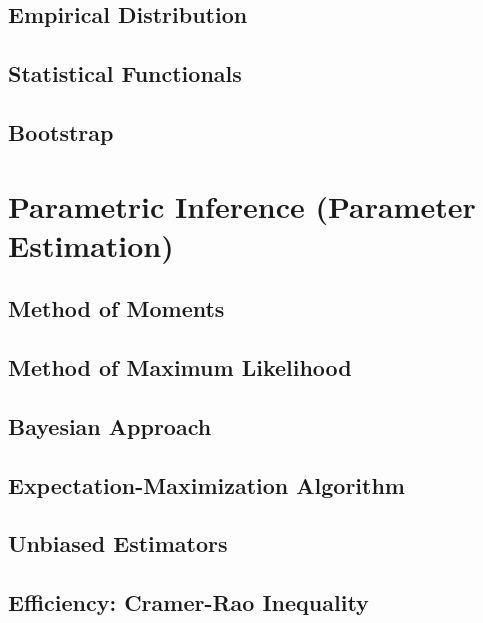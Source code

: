 \documentclass[
  openany]{book}
\theoremstyle{definition}
\theoremstyle{definition}
\theoremstyle{definition}
\theoremstyle{definition}
\theoremstyle{remark}
\begin{document}
\section{Empirical Distribution}\label{empirical-distribution}

\section{Statistical Functionals}\label{statistical-functionals}

\section{Bootstrap}\label{bootstrap}

\chapter{Parametric Inference (Parameter Estimation)}\label{parametric-inference-parameter-estimation}

\section{Method of Moments}\label{method-of-moments-1}

\section{Method of Maximum Likelihood}\label{method-of-maximum-likelihood}

\section{Bayesian Approach}\label{bayesian-approach}

\section{Expectation-Maximization Algorithm}\label{expectation-maximization-algorithm}

\section{Unbiased Estimators}\label{unbiased-estimators}

\section{Efficiency: Cramer-Rao Inequality}\label{efficiency-cramer-rao-inequality}
\end{document}
